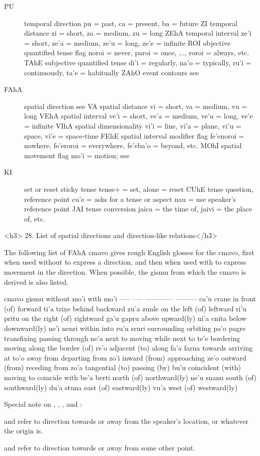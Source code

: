 \begin{description}
\item[PU] temporal direction pu = past, ca = present, ba = future ZI temporal distance zi = short, za = medium, zu = long ZEhA temporal interval ze'i = short, ze'a = medium, ze'u = long, ze'e = infinite ROI objective quantified tense flag noroi = never, paroi = once, ..., roroi = always, etc. TAhE subjective quantified tense di'i = regularly, na'o = typically, ru'i = continuously, ta'e = habitually ZAhO event contours see \item[FAhA] spatial direction see  VA spatial distance vi = short, va = medium, vu = long VEhA spatial interval ve'i = short, ve'a = medium, ve'u = long, ve'e = infinite VIhA spatial dimensionality vi'i = line, vi'a = plane, vi'u = space, vi'e = space-time FEhE spatial interval modifier flag fe'enoroi = nowhere, fe'eroroi = everywhere, fe'eba'o = beyond, etc. MOhI spatial movement flag mo'i = motion; see 
\item[KI] set or reset sticky tense tense+ = set,  alone = reset CUhE tense question, reference point cu'e = asks for a tense or aspect nau = use speaker's reference point JAI tense conversion jaica = the time of, jaivi = the place of, etc.
\end{description}

<h3>
28. List of spatial directions and direction-like
    relations</h3>

The following list of FAhA cmavo gives rough English glosses
    for the cmavo, first when used without  to express a
    direction, and then when used with  to express movement
    in the direction. When possible, the gismu from which the cmavo
    is derived is also listed.

cmavo  gismu   without mo'i        with mo'i
-----   -----   ------------        ---------
ca'u    crane   in front (of)       forward
ti'a    trixe   behind          backward
zu'a    zunle   on the left (of)    leftward
ri'u    pritu   on the right (of)   rightward
ga'u    gapru   above           upward(ly)
ni'a    cnita   below           downward(ly)
ne'i    nenri   within          into
ru'u    sruri   surrounding     orbiting
pa'o    pagre   transfixing     passing through
ne'a        next to         moving while next to        
te'e        bordering       moving along the border (of)
re'o        adjacent (to)       along
fa'a    farna   towards         arriving at
to'o        away from               departing from
zo'i        inward (from)       approaching
ze'o        outward (from)      receding from
zo'a        tangential (to)     passing (by)
bu'u        coincident (with)   moving to coincide with
be'a    berti   north (of)      northward(ly)
ne'u    snanu   south (of)      southward(ly)
du'a    stuna   east (of)       eastward(ly)
vu'a        west (of)       westward(ly)

Special note on , , , and : 

 and  refer to direction towards or away
    from the speaker's location, or whatever the origin is.

 and  refer to direction towards or away
    from some other point.